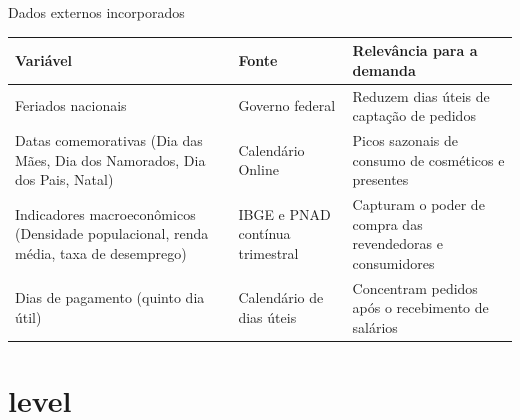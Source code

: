 \documentclass[aspectratio=169,11pt]{beamer}
\begin{document}
\begin{frame}{Dados externos incorporados}
\centering
\small
\begin{tabular}{p{4.2cm} p{3.6cm} p{4.6cm}}
\toprule
\textbf{Variável} & \textbf{Fonte} & \textbf{Relevância para a demanda} \\
\midrule
Feriados nacionais & Governo federal & Reduzem dias úteis de captação de pedidos \\[4pt]
Datas comemorativas (Dia das Mães, Dia dos Namorados, Dia dos Pais, Natal) & Calendário Online & Picos sazonais de consumo de cosméticos e presentes \\[4pt]
Indicadores macroeconômicos (Densidade populacional, renda média, taxa de desemprego) & IBGE e PNAD contínua trimestral & Capturam o poder de compra das revendedoras e consumidores \\[4pt]
Dias de pagamento (quinto dia útil) & Calendário de dias úteis & Concentram pedidos após o recebimento de salários \\
\bottomrule
\end{tabular}
\end{frame}

\section{level}
\end{document}

